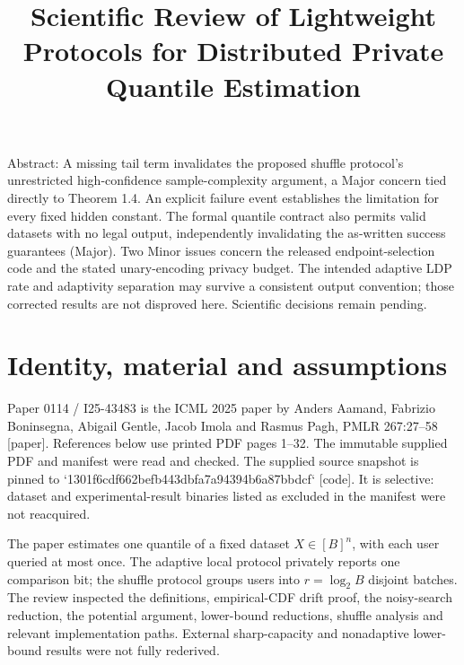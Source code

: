 \documentclass[10pt]{article}
\title{Scientific Review of
Lightweight Protocols for Distributed
Private Quantile Estimation}
\author{}
\date{}
\begin{document}
\maketitle
Abstract: A missing tail term invalidates the proposed shuffle protocol’s unrestricted high-confidence sample-complexity argument, a Major concern tied directly to Theorem 1.4. An explicit failure event establishes the limitation for every fixed hidden constant. The formal quantile contract also permits valid datasets with no legal output, independently invalidating the as-written success guarantees (Major). Two Minor issues concern the released endpoint-selection code and the stated unary-encoding privacy budget. The intended adaptive LDP rate and adaptivity separation may survive a consistent output convention; those corrected results are not disproved here. Scientific decisions remain pending.\par
\section*{Identity, material and assumptions}
Paper 0114 / I25-43483 is the ICML 2025 paper by Anders Aamand, Fabrizio Boninsegna, Abigail Gentle, Jacob Imola and Rasmus Pagh, PMLR 267:27–58 [paper]. References below use printed PDF pages 1–32. The immutable supplied PDF and manifest were read and checked. The supplied source snapshot is pinned to `1301f6cdf662befb443dbfa7a94394b6a87bbdcf` [code]. It is selective: dataset and experimental-result binaries listed as excluded in the manifest were not reacquired.\par
The paper estimates one quantile of a fixed dataset \(X\in[B]^n\), with each user queried at most once. The adaptive local protocol privately reports one comparison bit; the shuffle protocol groups users into \(r=\log_2B\) disjoint batches. The review inspected the definitions, empirical-CDF drift proof, the noisy-search reduction, the potential argument, lower-bound reductions, shuffle analysis and relevant implementation paths. External sharp-capacity and nonadaptive lower-bound results were not fully rederived.\par
\end{document}
